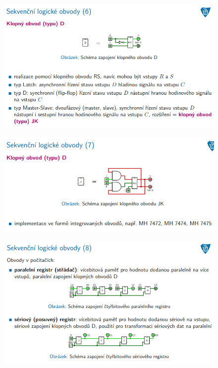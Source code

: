 \documentclass[10pt,a4paper]{article}
\begin{document}
\begin{figure} [h]
	\includegraphics[scale=0.65]{img/prvni_odstavec/otazka2/sekvencni_logicke_obvody6.png}	
\end{figure}

\clearpage
\begin{figure} [h]
	\includegraphics[scale=0.65]{img/prvni_odstavec/otazka2/sekvencni_logicke_obvody7.png}	
\end{figure}

\begin{figure} [h]
	\includegraphics[scale=0.65]{img/prvni_odstavec/otazka2/sekvencni_logicke_obvody8.png}	
\end{figure}
\end{document}
